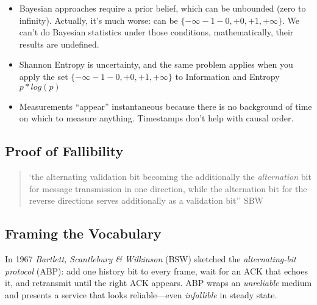 \begin{description}
\begin{itemize}
	\item  Bayesian approaches require a prior belief, which can be unbounded (zero to infinity). Actually, it’s much worse: can be $\{-\infty-1-0,+0,+1,+\infty\}$. We can’t do Bayesian statistics under those conditions, mathematically, their results are undefined.
	\item Shannon Entropy is uncertainty, and the same problem applies when you apply the set $\{-\infty-1-0,+0,+1,+\infty\}$ to Information and Entropy $p*log(p)$
	\item  Measurements ``appear'' instantaneous because there is no background of time on which to measure anything. Timestamps don’t help with causal order.
	\end{itemize}
\end{description}





\subsection{Proof of Fallibility}

\begin{quotation}
`the alternating validation bit becoming the additionally the \emph{alternation} bit for message transmission in one direction, while the alternation bit for the reverse directions serves additionally  as a validation bit'' SBW \cite{SBW}
\end{quotation}






\subsection{Framing the Vocabulary}

In 1967 \emph{Bartlett, Scantlebury \& Wilkinson} (BSW) sketched the
\emph{alternating-bit protocol} (ABP): add one history bit to every frame,
wait for an ACK that echoes it, and retransmit until the right ACK appears.
ABP wraps an \emph{unreliable} medium and presents a service that looks
reliable---even \emph{infallible} in steady state.

